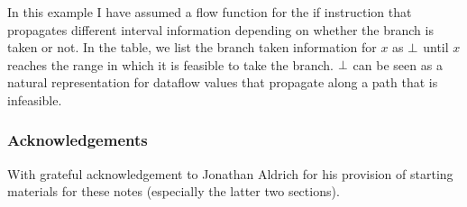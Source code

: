 \documentclass[11pt]{article}
\begin{document}
\begin{sloppypar}
In this example I have assumed a flow function for the if instruction that propagates different interval information depending on whether the branch is taken or not.  In the table, we list the branch taken information for $x$ as $\bot$ until $x$ reaches the range in which it is feasible to take the branch.  $\bot$ can be seen as a natural representation for dataflow values that propagate along a path that is infeasible.


\end{sloppypar}

\subsubsection*{Acknowledgements}

With grateful acknowledgement to Jonathan Aldrich for his provision of starting
materials for these notes (especially the latter two sections). 
\end{document}
